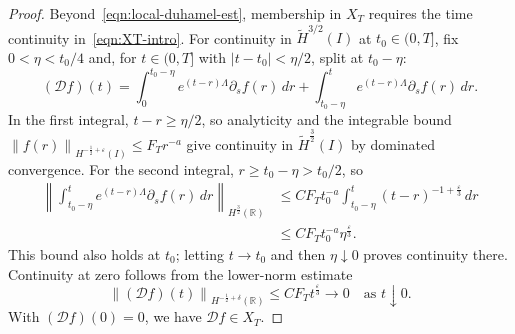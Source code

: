 \documentclass[10pt,a4paper]{amsart}
\newcommand{\R}{\mathbb{R}}
\newcommand{\abs}[1]{\left\lvert #1 \right\rvert}
\newcommand{\hi}[1]{H^{#1}(I)}
\newcommand{\hr}[1]{H^{#1}(\R)}
\newcommand{\mc}[1]{\mathcal{#1}}
\newcommand{\norm}[1]{\left\lVert #1 \right\rVert}
\newcommand{\p}{\partial}
\newcommand{\thi}[1]{\wt H^{#1}(I)}
\newcommand{\wt}[1]{\widetilde{#1}}
\begin{document}
\begin{proof}
Beyond~\eqref{eqn:local-duhamel-est}, membership in $X_T$ requires the
time continuity in~\eqref{eqn:XT-intro}. For continuity in $\thi{3/2}$
at $t_0\in(0,T]$, fix $0<\eta<t_0/4$ and, for $t\in(0,T]$ with
$\abs{t-t_0}<\eta/2$, split at $t_0-\eta$:
\begin{equation*}
    (\mc Df)(t)
    =\int_0^{t_0-\eta}e^{(t-r)\Lambda}\p_s f(r)\,dr
    +\int_{t_0-\eta}^t e^{(t-r)\Lambda}\p_s f(r)\,dr.
\end{equation*}
In the first integral, $t-r\ge\eta/2$, so analyticity and the integrable
bound $\norm{f(r)}_{\hi{-\frac12+\varepsilon}}\le F_T r^{-a}$ give
continuity in $\thi{\frac32}$ by dominated convergence.
For the second integral, $r\ge t_0-\eta>t_0/2$, so
\begin{equation*}
\begin{aligned}
    \norm{\int_{t_0-\eta}^t e^{(t-r)\Lambda}\p_s f(r)\,dr}_{\hr{\frac32}}
    &\le C F_T t_0^{-a}
    \int_{t_0-\eta}^t(t-r)^{-1+\frac{\varepsilon}{3}}\,dr\\
    &\le C F_T t_0^{-a}\eta^{\frac{\varepsilon}{3}}.
\end{aligned}
\end{equation*}
This bound also holds at $t_0$; letting $t\to t_0$ and then
$\eta\downarrow0$ proves continuity there.
Continuity at zero follows from the lower-norm estimate
\begin{equation*}
    \norm{(\mc Df)(t)}_{\hr{-\frac12+\delta}}
    \le C F_T t^{\frac{\varepsilon}{3}}\longrightarrow0
    \quad\text{as }t\downarrow0.
\end{equation*}
With $(\mc Df)(0)=0$, we have $\mc Df\in X_T$.


\end{proof}
\end{document}
